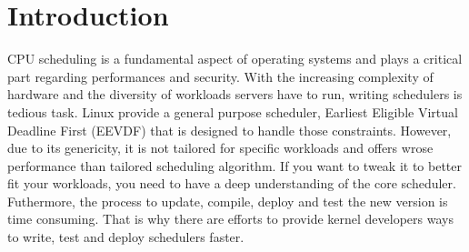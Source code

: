 \section{Introduction}

\par CPU scheduling is a fundamental aspect of operating systems and plays a critical part regarding performances and security. With the increasing complexity of hardware and the diversity of workloads servers have to run, writing schedulers is tedious task. Linux provide a general purpose scheduler, Earliest Eligible Virtual Deadline First (EEVDF) that is designed to handle those constraints. However, due to its genericity, it is not tailored for specific workloads and offers wrose performance than tailored scheduling algorithm.  If you want to tweak it to better fit your workloads, you need to have a deep understanding of the core scheduler. Futhermore, the process to update, compile, deploy and test the new version is time consuming. That is why there are efforts to provide kernel developers ways to write, test and deploy schedulers faster. \newline